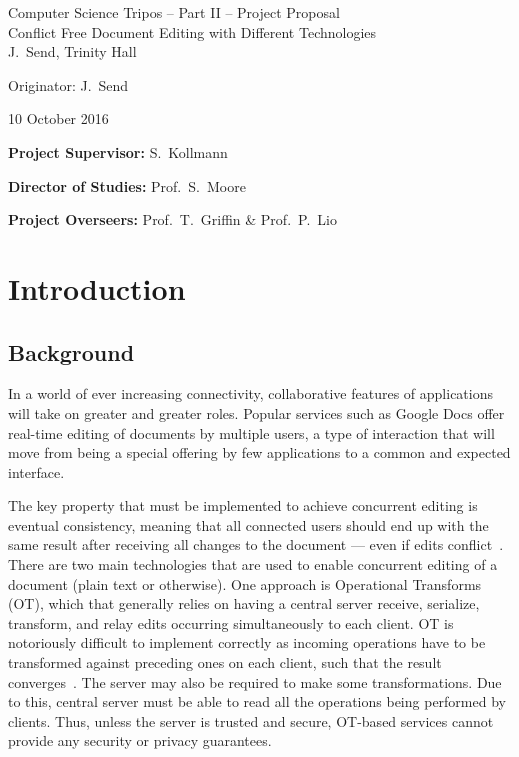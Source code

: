 \documentclass[12pt,a4paper,twoside]{article}
\begin{document}
\begin{center}
\Large
Computer Science Tripos -- Part II -- Project Proposal\\[4mm]
\LARGE
Conflict Free Document Editing with Different Technologies\\[4mm]

\large
J.~Send, Trinity Hall

Originator: J.~Send

10 October 2016
\end{center}

\vspace{5mm}

\textbf{Project Supervisor:} S.~Kollmann

\textbf{Director of Studies:} Prof.~S.~Moore

\textbf{Project Overseers:} Prof.~T.~Griffin \& Prof.~P.~Lio


\section*{Introduction}

\subsection*{Background}

In a world of ever increasing connectivity, collaborative features of applications
will take on greater and greater roles. Popular services such as Google Docs offer real-time
editing of documents by multiple users, a type of interaction that will move from being
a special offering by few applications to a common and expected interface.

The key property that must be implemented to achieve concurrent editing is eventual consistency,
meaning that all connected users should end up with the same result after receiving all changes to the document 
--- even if edits conflict~\cite{Technion}. There are two main technologies that are used to enable concurrent editing of a document (plain text or otherwise). One approach is Operational Transforms (OT), 
which that generally relies  on having a central server receive, serialize, transform, and 
relay edits occurring simultaneously to each client. OT is notoriously difficult to implement 
correctly as incoming operations have to be transformed against preceding ones on each client, 
such that the result converges~\cite{sun1998operational}. The server may also be required to make some transformations. 
Due to this, central server must be able to read all the operations being performed by clients.
Thus, unless the server is trusted and secure, OT-based services cannot provide any security or privacy guarantees. 
\end{document}
